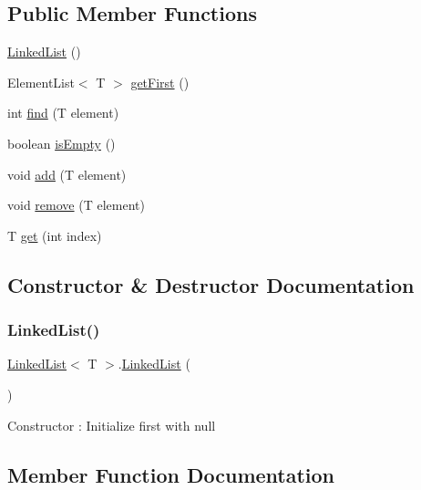 \subsection*{Public Member Functions}
\begin{DoxyCompactItemize}
\item 
\mbox{\hyperlink{class_linked_list_ae04bfb6ff80214a33132ba72ceb117aa}{Linked\+List}} ()
\item 
Element\+List$<$ T $>$ \mbox{\hyperlink{class_linked_list_a312a0b29e235fdd9e0ceb42048e26600}{get\+First}} ()
\item 
int \mbox{\hyperlink{class_linked_list_abb5fc485a297b815daf6034f1c455979}{find}} (T element)
\item 
boolean \mbox{\hyperlink{class_linked_list_aecae3d82587c52087a4f65d6c56900e2}{is\+Empty}} ()
\item 
void \mbox{\hyperlink{class_linked_list_af7ec408e2f1040643d77f614af535988}{add}} (T element)
\item 
void \mbox{\hyperlink{class_linked_list_a85388ca2d7e4c8bc06fbea2c6fcfea33}{remove}} (T element)
\item 
T \mbox{\hyperlink{class_linked_list_a032ef46fc54f12525746d9f7c3a80663}{get}} (int index)
\end{DoxyCompactItemize}


\subsection{Constructor \& Destructor Documentation}
\mbox{\label{class_linked_list_ae04bfb6ff80214a33132ba72ceb117aa}} 
\subsubsection{\texorpdfstring{Linked\+List()}{LinkedList()}}
{\footnotesize\ttfamily \mbox{\hyperlink{class_linked_list}{Linked\+List}}$<$ T $>$.\mbox{\hyperlink{class_linked_list}{Linked\+List}} (\begin{DoxyParamCaption}{ }\end{DoxyParamCaption})\hspace{0.3cm}{\ttfamily [inline]}}

Constructor \+: Initialize first with null 

\subsection{Member Function Documentation}
\mbox{\label{class_linked_list_af7ec408e2f1040643d77f614af535988}} 
